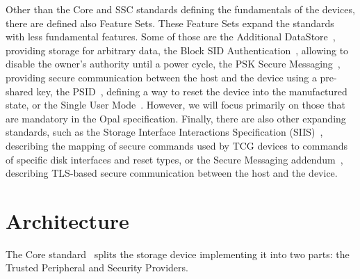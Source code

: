 Other than the Core and SSC standards defining the fundamentals of the devices, there are defined also Feature Sets. These Feature Sets expand the standards with less fundamental features. Some of those are 
the Additional DataStore~\cite{tcg-additional-datastore}, providing storage for arbitrary data,
the Block SID Authentication~\cite{tcg-block-sid-auth}, allowing to disable the owner's authority until a power cycle,
the PSK Secure Messaging~\cite{tcg-psk-secure-messaging}, providing secure communication between the host and the device using a pre-shared key,
the PSID~\cite{tcg-psid}, defining a way to reset the device into the manufactured state,
or the Single User Mode~\cite{tcg-sum}.
However, we will focus primarily on those that are mandatory in the Opal specification.
Finally, there are also other expanding standards, such as the Storage Interface Interactions Specification (SIIS)~\cite{tcg-siis}, describing the mapping of secure commands used by TCG devices to commands of specific disk interfaces and reset types, or the Secure Messaging addendum~\cite{tcg-secure-messaging-addendum}, describing TLS-based secure communication between the host and the device.

\section{Architecture}



    

The Core standard~\cite{tcg-storage-core} splits the storage device implementing it into two parts: the Trusted Peripheral and Security Providers.

